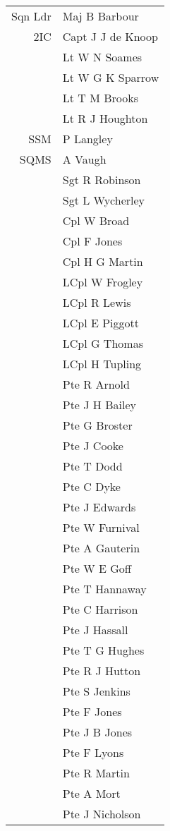 \begin{center}
  \begin{tabular}{rl}
    Sqn Ldr & Maj B Barbour \\
    2IC & Capt J J de Knoop \\
    & Lt W N Soames \\
    & Lt W G K Sparrow \\
    & Lt T M Brooks \\
    & Lt R J Houghton \\
    SSM & P Langley \\
    SQMS & A Vaugh \\
    & Sgt R Robinson \\
    & Sgt L Wycherley \\
    & Cpl W Broad \\
    & Cpl F Jones \\
    & Cpl H G Martin \\
    & LCpl W Frogley \\
    & LCpl R Lewis \\
    & LCpl E Piggott \\
    & LCpl G Thomas \\
    & LCpl H Tupling \\
    & Pte R Arnold \\
    & Pte J H Bailey \\
    & Pte G Broster \\
    & Pte J Cooke \\
    & Pte T Dodd \\
    & Pte C Dyke \\
    & Pte J Edwards \\
    & Pte W Furnival \\
    & Pte A Gauterin \\
    & Pte W E Goff \\
    & Pte T Hannaway \\
    & Pte C Harrison \\
    & Pte J Hassall \\
    & Pte T G Hughes \\
    & Pte R J Hutton \\
    & Pte S Jenkins \\
    & Pte F Jones \\
    & Pte J B Jones \\
    & Pte F Lyons \\
    & Pte R Martin \\
    & Pte A Mort \\
    & Pte J Nicholson \\

\end{tabular}
\end{center}
